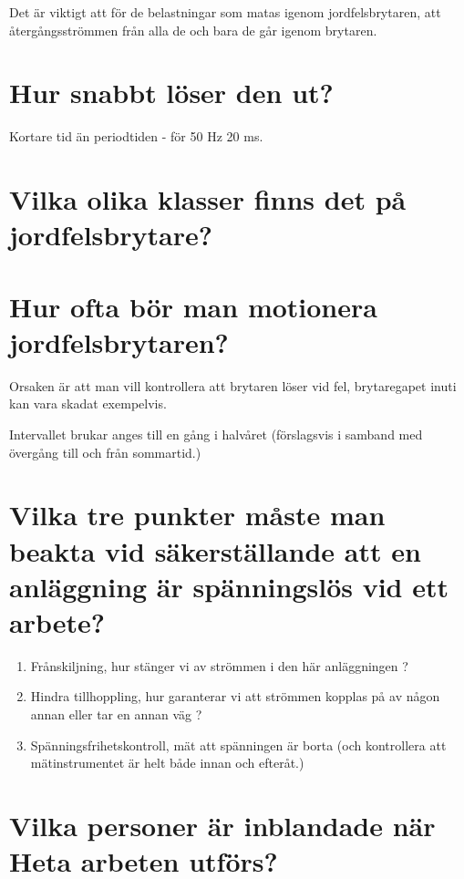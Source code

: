 \documentclass[a4paper,swedish]{article}
\begin{document}
Det är viktigt att för de belastningar som matas igenom jordfelsbrytaren, att återgångsströmmen från alla de och
bara de går igenom brytaren.

\setcounter{section}{31}
\section{Hur snabbt löser den ut?}\label{sec:RCD_how_fast}

Kortare tid än periodtiden - för 50 Hz  20 ms.

\setcounter{section}{33}
\section{Vilka olika klasser finns det på jordfelsbrytare?}\label{sec:RCD_klasser}

\setcounter{section}{35}
\section{Hur ofta bör man motionera jordfelsbrytaren?}\label{sec:motionering_RCD}

Orsaken är att man vill kontrollera att brytaren löser vid fel, brytaregapet inuti kan vara skadat exempelvis.

Intervallet brukar anges till en gång i halvåret (förslagsvis i samband med övergång till och från sommartid.)

\setcounter{section}{37}
\section{Vilka tre punkter måste man beakta vid säkerställande att en anläggning är
  spänningslös vid ett arbete?}

\begin{enumerate}
\item Frånskiljning, hur stänger vi av strömmen i den här anläggningen ?
\item Hindra tillhoppling, hur garanterar vi att strömmen kopplas på av någon annan eller tar en annan väg ?
\item Spänningsfrihetskontroll, mät att spänningen är borta (och kontrollera att mätinstrumentet är helt både innan och efteråt.)
\end{enumerate}

\setcounter{section}{39}
\section{Vilka personer är inblandade när Heta arbeten utförs?}\label{sec:heta_arbeten_roller}
\end{document}
